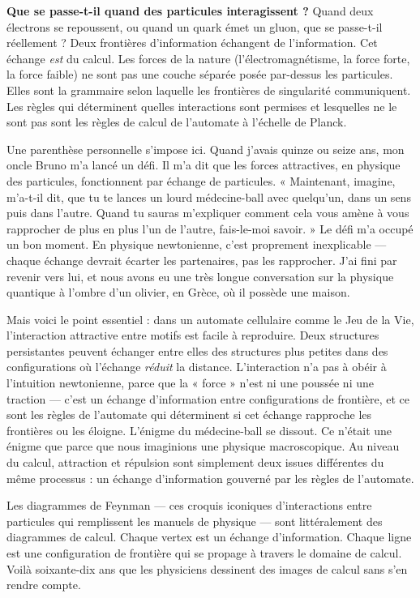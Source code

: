 \documentclass[11pt, twoside, openright]{book}
\begin{document}
\textbf{Que se passe-t-il quand des particules interagissent ?} Quand deux électrons se repoussent, ou quand un quark émet un gluon, que se passe-t-il réellement ? Deux frontières d'information échangent de l'information. Cet échange \textit{est} du calcul. Les forces de la nature (l'électromagnétisme, la force forte, la force faible) ne sont pas une couche séparée posée par-dessus les particules. Elles sont la grammaire selon laquelle les frontières de singularité communiquent. Les règles qui déterminent quelles interactions sont permises et lesquelles ne le sont pas sont les règles de calcul de l'automate à l'échelle de Planck.

Une parenthèse personnelle s'impose ici. Quand j'avais quinze ou seize ans, mon oncle Bruno m'a lancé un défi. Il m'a dit que les forces attractives, en physique des particules, fonctionnent par échange de particules. « Maintenant, imagine, m'a-t-il dit, que tu te lances un lourd médecine-ball avec quelqu'un, dans un sens puis dans l'autre. Quand tu sauras m'expliquer comment cela vous amène à vous rapprocher de plus en plus l'un de l'autre, fais-le-moi savoir. » Le défi m'a occupé un bon moment. En physique newtonienne, c'est proprement inexplicable --- chaque échange devrait écarter les partenaires, pas les rapprocher. J'ai fini par revenir vers lui, et nous avons eu une très longue conversation sur la physique quantique à l'ombre d'un olivier, en Grèce, où il possède une maison.

Mais voici le point essentiel : dans un automate cellulaire comme le Jeu de la Vie, l'interaction attractive entre motifs est facile à reproduire. Deux structures persistantes peuvent échanger entre elles des structures plus petites dans des configurations où l'échange \textit{réduit} la distance. L'interaction n'a pas à obéir à l'intuition newtonienne, parce que la « force » n'est ni une poussée ni une traction --- c'est un échange d'information entre configurations de frontière, et ce sont les règles de l'automate qui déterminent si cet échange rapproche les frontières ou les éloigne. L'énigme du médecine-ball se dissout. Ce n'était une énigme que parce que nous imaginions une physique macroscopique. Au niveau du calcul, attraction et répulsion sont simplement deux issues différentes du même processus : un échange d'information gouverné par les règles de l'automate.

Les diagrammes de Feynman --- ces croquis iconiques d'interactions entre particules qui remplissent les manuels de physique --- sont littéralement des diagrammes de calcul. Chaque vertex est un échange d'information. Chaque ligne est une configuration de frontière qui se propage à travers le domaine de calcul. Voilà soixante-dix ans que les physiciens dessinent des images de calcul sans s'en rendre compte.
\end{document}
